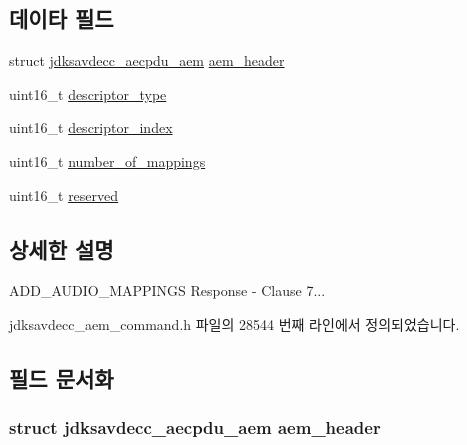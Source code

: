 \subsection*{데이타 필드}
\begin{DoxyCompactItemize}
\item 
struct \hyperlink{structjdksavdecc__aecpdu__aem}{jdksavdecc\+\_\+aecpdu\+\_\+aem} \hyperlink{structjdksavdecc__aem__command__add__audio__mappings__response_ae1e77ccb75ff5021ad923221eab38294}{aem\+\_\+header}
\item 
uint16\+\_\+t \hyperlink{structjdksavdecc__aem__command__add__audio__mappings__response_ab7c32b6c7131c13d4ea3b7ee2f09b78d}{descriptor\+\_\+type}
\item 
uint16\+\_\+t \hyperlink{structjdksavdecc__aem__command__add__audio__mappings__response_a042bbc76d835b82d27c1932431ee38d4}{descriptor\+\_\+index}
\item 
uint16\+\_\+t \hyperlink{structjdksavdecc__aem__command__add__audio__mappings__response_ac7db472c5622ef473d5d0a5c416d5531}{number\+\_\+of\+\_\+mappings}
\item 
uint16\+\_\+t \hyperlink{structjdksavdecc__aem__command__add__audio__mappings__response_a5a6ed8c04a3db86066924b1a1bf4dad3}{reserved}
\end{DoxyCompactItemize}


\subsection{상세한 설명}
A\+D\+D\+\_\+\+A\+U\+D\+I\+O\+\_\+\+M\+A\+P\+P\+I\+N\+GS Response -\/ Clause 7... 

jdksavdecc\+\_\+aem\+\_\+command.\+h 파일의 28544 번째 라인에서 정의되었습니다.



\subsection{필드 문서화}
\subsubsection[{\texorpdfstring{aem\+\_\+header}{aem_header}}]{\setlength{\rightskip}{0pt plus 5cm}struct {\bf jdksavdecc\+\_\+aecpdu\+\_\+aem} aem\+\_\+header}\hypertarget{structjdksavdecc__aem__command__add__audio__mappings__response_ae1e77ccb75ff5021ad923221eab38294}{}\label{structjdksavdecc__aem__command__add__audio__mappings__response_ae1e77ccb75ff5021ad923221eab38294}


